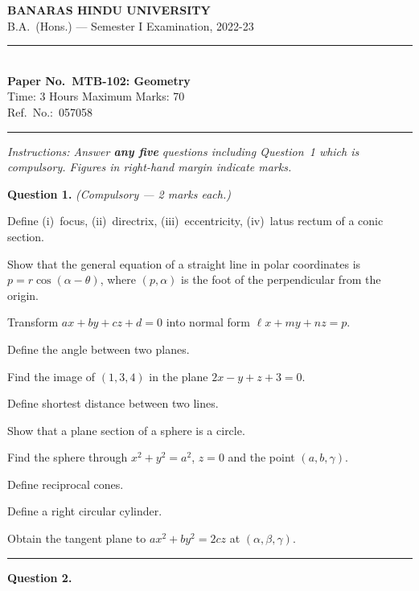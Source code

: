 \documentclass[11pt,a4paper]{article}
\begin{document}
\begin{center}
  {\large\bfseries BANARAS HINDU UNIVERSITY}\\[2pt]
  {\normalsize B.A.\ (Hons.) --- Semester I Examination, 2022-23}\\[6pt]
  \rule{0.8\linewidth}{0.5pt}\\[6pt]
  {\large\bfseries Paper No.\ MTB-102: Geometry}\\[4pt]
  {\normalsize Time: 3 Hours \hfill Maximum Marks: 70}\\[2pt]
  {\small Ref.\ No.:\ 057058}
\end{center}
\rule{\linewidth}{0.4pt}
\smallskip



\noindent   \textit{Instructions: Answer   \textbf{any five} questions including Question~1 which is compulsory. Figures in right-hand margin indicate marks.}
\bigskip




\noindent   \textbf{Question 1.}   \textit{(Compulsory --- 2 marks each.)}

\begin{parts}
  \item Define (i)~focus, (ii)~directrix, (iii)~eccentricity, (iv)~latus rectum of a conic section.
  \item Show that the general equation of a straight line in polar coordinates is $p=r\cos(\alpha- \theta)$, where $(p,\alpha)$ is the foot of the perpendicular from the origin.
  \item Transform $ax+by+cz+d=0$ into normal form $\ell x+my+nz=p$.
  \item Define the angle between two planes.
  \item Find the image of $(1,3,4)$ in the plane $2x-y+z+3=0$.
  \item Define shortest distance between two lines.
  \item Show that a plane section of a sphere is a circle.
  \item Find the sphere through $x^2+y^2=a^2$, $z=0$ and the point $(a,b,\gamma)$.
  \item Define reciprocal cones.
  \item Define a right circular cylinder.
  \item Obtain the tangent plane to $ax^2+by^2=2cz$ at $(\alpha,\beta,\gamma)$.
\end{parts}
\medskip\rule{\linewidth}{0.2pt}

\medskip


\noindent   \textbf{Question 2.}
\end{document}
